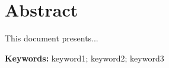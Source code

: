 %
%
%
%
%
%
%

\chapter*{Abstract}

This document presents...

\vspace{0.5cm}

\textbf{Keywords:} keyword1; keyword2; keyword3
